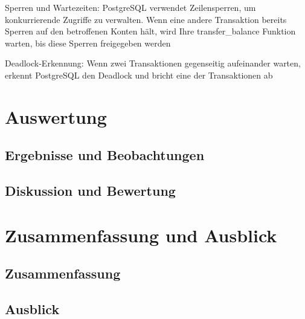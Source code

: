 \documentclass[fontsize=12pt,paper=a4,twoside=semi,parskip=half-,headsepline,headinclude]{scrreprt}
\begin{document}
Sperren und Wartezeiten:
PostgreSQL verwendet Zeilensperren, um konkurrierende Zugriffe zu verwalten. Wenn eine andere Transaktion bereits Sperren auf den betroffenen Konten hält, wird Ihre transfer\_balance Funktion warten, bis diese Sperren freigegeben werden

Deadlock-Erkennung:
Wenn zwei Transaktionen gegenseitig aufeinander warten, erkennt PostgreSQL den Deadlock und bricht eine der Transaktionen ab


\chapter{Auswertung}

\section{Ergebnisse und Beobachtungen}

\section{Diskussion und Bewertung}



\chapter{Zusammenfassung und Ausblick}

\section{Zusammenfassung}

\section{Ausblick}



\printbibliography


%
%
%
%
%
%
%
\end{document}
